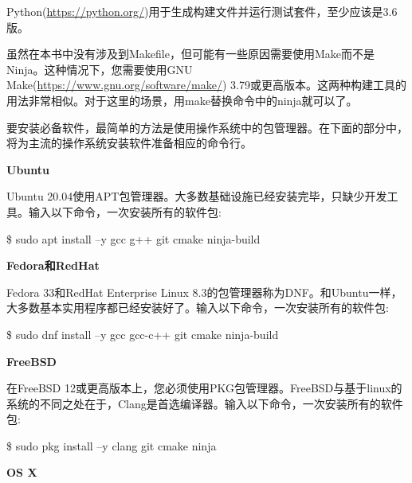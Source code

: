 Python(\url{https://python.org/})用于生成构建文件并运行测试套件，至少应该是3.6版。\par

虽然在本书中没有涉及到Makefile，但可能有一些原因需要使用Make而不是Ninja。这种情况下，您需要使用GNU Make(\url{https://www.gnu.org/software/make/}) 3.79或更高版本。这两种构建工具的用法非常相似。对于这里的场景，用make替换命令中的ninja就可以了。\par

要安装必备软件，最简单的方法是使用操作系统中的包管理器。在下面的部分中，将为主流的操作系统安装软件准备相应的命令行。\par

\hspace*{\fill} \par %
\textbf{Ubuntu}

Ubuntu 20.04使用APT包管理器。大多数基础设施已经安装完毕，只缺少开发工具。输入以下命令，一次安装所有的软件包:\par

\begin{tcolorbox}[colback=white,colframe=black]
\$ sudo apt install –y gcc g++ git cmake ninja-build
\end{tcolorbox}

\hspace*{\fill} \par %
\textbf{Fedora和RedHat}

Fedora 33和RedHat Enterprise Linux 8.3的包管理器称为DNF。和Ubuntu一样，大多数基本实用程序都已经安装好了。输入以下命令，一次安装所有的软件包:\par

\begin{tcolorbox}[colback=white,colframe=black]
\$ sudo dnf install –y gcc gcc-c++ git cmake ninja-build
\end{tcolorbox}

\hspace*{\fill} \par %
\textbf{FreeBSD}

在FreeBSD 12或更高版本上，您必须使用PKG包管理器。FreeBSD与基于linux的系统的不同之处在于，Clang是首选编译器。输入以下命令，一次安装所有的软件包:\par

\begin{tcolorbox}[colback=white,colframe=black]
\$ sudo pkg install –y clang git cmake ninja
\end{tcolorbox}

\hspace*{\fill} \par %
\textbf{OS X}

